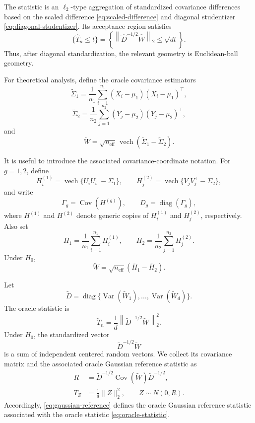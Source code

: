 \documentclass[
  12pt]{article}
\theoremstyle{plain}
\theoremstyle{definition}
\theoremstyle{remark}
\begin{document}
The statistic is an \(\ell_2\)-type aggregation of standardized covariance
differences based on the scaled difference \eqref{eq:scaled-difference} and
diagonal studentizer \eqref{eq:diagonal-studentizer}.  Its acceptance region
satisfies
\begin{equation}
\label{eq:acceptance-ball}
\{\widehat T_n\le t\}
=
\left\{
\left\|
\widehat D^{-1/2}\widehat W
\right\|_2
\le \sqrt{dt}
\right\}.
\end{equation}
Thus, after diagonal standardization, the relevant geometry is Euclidean-ball
geometry.

For theoretical analysis, define the oracle covariance estimators
\[
\widetilde\Sigma_1
=
\frac1{n_1}\sum_{i=1}^{n_1}(X_i-\mu_1)(X_i-\mu_1)^\top,
\]
\[
\widetilde\Sigma_2
=
\frac1{n_2}\sum_{j=1}^{n_2}(Y_j-\mu_2)(Y_j-\mu_2)^\top,
\]
and
\[
\widetilde W
=
\sqrt{n_{\mathrm{eff}}}\,
\operatorname{vech}(\widetilde\Sigma_1-\widetilde\Sigma_2).
\]

It is useful to introduce the associated covariance-coordinate notation.  For
\(g=1,2\), define
\[
H_i^{(1)}
=
\operatorname{vech}\{U_iU_i^\top-\Sigma_1\},
\qquad
H_j^{(2)}
=
\operatorname{vech}\{V_jV_j^\top-\Sigma_2\},
\]
and write
\[
\Gamma_g=\operatorname{Cov}(H^{(g)}),
\qquad
D_g=\operatorname{diag}(\Gamma_g),
\]
where \(H^{(1)}\) and \(H^{(2)}\) denote generic copies of \(H_i^{(1)}\) and
\(H_j^{(2)}\), respectively.  Also set
\[
\bar H_1=\frac1{n_1}\sum_{i=1}^{n_1}H_i^{(1)},
\qquad
\bar H_2=\frac1{n_2}\sum_{j=1}^{n_2}H_j^{(2)}.
\]
Under \(H_0\),
\[
\widetilde W
=
\sqrt{n_{\mathrm{eff}}}(\bar H_1-\bar H_2).
\]

Let
\[
\widetilde D
=
\operatorname{diag}
\{
\operatorname{Var}(\widetilde W_1),\ldots,
\operatorname{Var}(\widetilde W_d)
\}.
\]
The oracle statistic is
\begin{equation}
\label{eq:oracle-statistic}
\widetilde T_n
=
\frac1d
\left\|
\widetilde D^{-1/2}\widetilde W
\right\|_2^2.
\end{equation}
Under \(H_0\), the standardized vector
\[
\widetilde D^{-1/2}\widetilde W
\]
is a sum of independent centered random vectors.  We collect its covariance
matrix and the associated oracle Gaussian reference statistic as
\begin{equation}
\label{eq:gaussian-reference}
\begin{aligned}
R
&=
\widetilde D^{-1/2}
\operatorname{Cov}(\widetilde W)
\widetilde D^{-1/2},\\
T_Z
&=
\frac1d\|Z\|_2^2,
\qquad
Z\sim N(0,R).
\end{aligned}
\end{equation}
Accordingly, \eqref{eq:gaussian-reference} defines the oracle Gaussian
reference statistic associated with the oracle statistic
\eqref{eq:oracle-statistic}.
\end{document}

